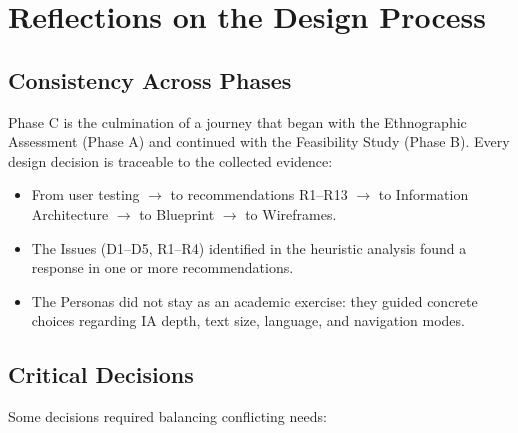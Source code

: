 \vspace{0.3cm}

\section{Reflections on the Design Process}

\subsection{Consistency Across Phases}

Phase C is the culmination of a journey that began with the Ethnographic Assessment (Phase A) and continued with the Feasibility Study (Phase B). Every design decision is traceable to the collected evidence:

\begin{itemize}
    \item From user testing $\rightarrow$ to recommendations R1--R13 $\rightarrow$ to Information Architecture $\rightarrow$ to Blueprint $\rightarrow$ to Wireframes.
    \item The Issues (D1--D5, R1--R4) identified in the heuristic analysis found a response in one or more recommendations.
    \item The Personas did not stay as an academic exercise: they guided concrete choices regarding IA depth, text size, language, and navigation modes.
\end{itemize}

\subsection{Critical Decisions}

Some decisions required balancing conflicting needs:

